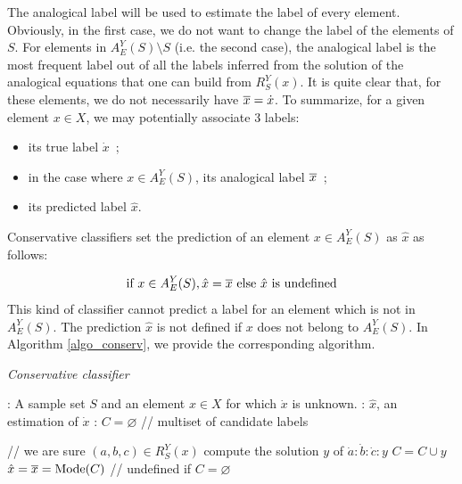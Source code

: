 The analogical label will be used to estimate the label of every element.
Obviously, in the first case, we do not want to change the label of the
elements of $S$.  For elements in $A_E^Y(S) \setminus S$ (i.e.  the second
case), the analogical label is the most frequent label out of all the labels inferred from the
solution of the analogical equations that one can build from $R_S^Y(x)$.  It is
quite clear that, for these elements,  we do not necessarily have
$\overline{x}=\dot{x}$.  To summarize, for a given element $x \in X$, we may 
potentially associate 3 labels:
\begin{itemize}
\item its true label $\dot{x}$~;
\item in the case where $x \in A_E^Y(S)$, its analogical label $\overline{x}$~;
\item its predicted label $\hat{x}$.
\end{itemize}
\noindent
Conservative classifiers set the prediction of an element $x \in A_E^Y(S)$ as
$\hat{x}$ as follows:

$$\mbox{if } x \in A_E^Y(S),  \hat{x} = \overline{x} \mbox{ else } \hat{x} \mbox{ is undefined}$$
This kind of classifier cannot predict a label for an element which is not in $A_E^Y(S)$.
The prediction $\hat{x}$ is not defined if $x$ does not belong to $A_E^Y(S)$.
In Algorithm \ref{algo_conserv}, we provide the corresponding algorithm.

\begin{algorithm}[!ht]
 \caption{\textit{Conservative classifier}}
       \label{algo_conserv}
       \begin{algorithmic}

      : A sample set $S$ and an element $x \in X$ for which
      $\dot{x}$ is unknown.
      : $\hat{x}$, an estimation of $\dot{x}$
      : $C = \varnothing$ \quad \quad // multiset of candidate labels

      \STATE // we are sure $(a, b, c) \in R_S^Y(x)$
      \STATE compute the solution $y$ of $\dot{a} : \dot{b} : \dot{c} : y$
      \STATE $ C = C \cup y$
      \ENDIF
	    \ENDFOR
      \STATE $\hat{x} = \overline{x}  = \text{Mode} (C)$ // undefined if $C = \varnothing$
\end{algorithmic}
\end{algorithm}

